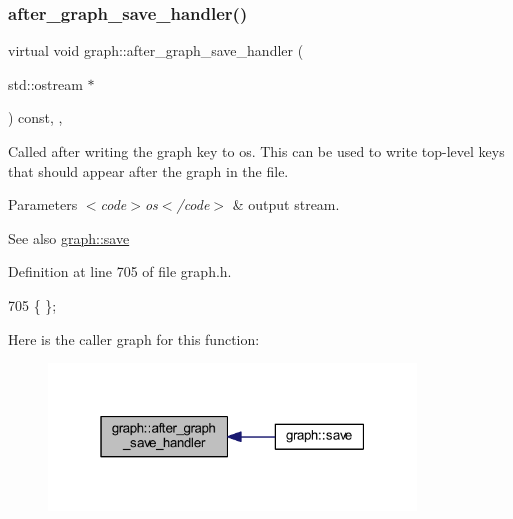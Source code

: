 \subsubsection{\texorpdfstring{after\+\_\+graph\+\_\+save\+\_\+handler()}{after\_graph\_save\_handler()}}
{\footnotesize\ttfamily virtual void graph\+::after\+\_\+graph\+\_\+save\+\_\+handler (\begin{DoxyParamCaption}\item[{std\+::ostream $\ast$}]{ }\end{DoxyParamCaption}) const\hspace{0.3cm}{\ttfamily [inline]}, {\ttfamily [virtual]}, {\ttfamily [inherited]}}

Called after writing the graph key to {\ttfamily os}. This can be used to write top-\/level keys that should appear after the graph in the file.


\begin{DoxyParams}{Parameters}
{\em $<$code$>$os$<$/code$>$} & output stream. \\
\hline
\end{DoxyParams}
\begin{DoxySeeAlso}{See also}
\mbox{\hyperlink{classgraph_a7bd0712a528249d1585085a64ac3e661}{graph\+::save}} 
\end{DoxySeeAlso}


Definition at line 705 of file graph.\+h.


\begin{DoxyCode}
705 \{ \};
\end{DoxyCode}
Here is the caller graph for this function\+:
\nopagebreak
\begin{figure}[H]
\begin{center}
\leavevmode
\includegraphics[width=277pt]{classgraph_af0c7aba21d57d827ae96cae632441651_icgraph}
\end{center}
\end{figure}
\mbox{\label{classgraph_aa0c7027e0cc7430b77ab9629eecefd3f}} 
